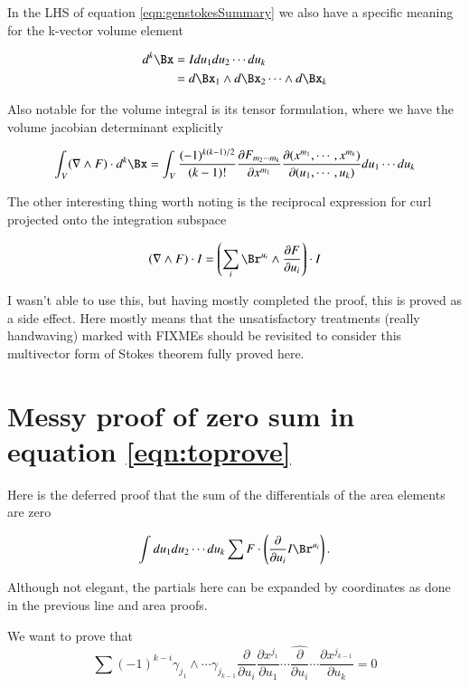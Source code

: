\documentclass{article}
\newcommand{\grad}[0]{\nabla}
\newcommand{\PD}[2]{\frac{\partial {#2}}{\partial {#1}}}
\begin{document}
In the LHS of equation \ref{eqn:genstokesSummary} we also have a specific meaning for the k-vector volume element

\begin{align}
d^{k}\Bx 
&= I du_1 du_2 \cdots du_k \\
&= d\Bx_1 \wedge d\Bx_2 \cdots \wedge d\Bx_k
\end{align}

Also notable for the volume integral is its tensor formulation, where we have the volume jacobian determinant explicitly

\begin{equation}
\int_V (\grad \wedge F) \cdot d^{k}\Bx 
= \int_V
\frac{(-1)^{k(k-1)/2}}{(k-1)!} 
\PD{x^{m_{1}}}{F_{m_2 \cdots m_{k}}}
\frac{\partial( x^{m_1}, \cdots, x^{m_k} )}{\partial( u_1, \cdots, u_k )} du_1 \cdots du_k
\end{equation}

The other interesting thing worth noting is the reciprocal expression for curl projected onto the integration subspace

\begin{equation}
(\grad \wedge F) \cdot I = \left( \sum_i \Br^{u_i} \wedge \PD{u_i}{F} \right) \cdot I 
\end{equation}

I wasn't able to use this, but having mostly completed the proof, this is proved as a side effect.  Here mostly means that the
unsatisfactory treatments (really handwaving) marked with FIXMEs should be revisited to consider this multivector form of Stokes theorem fully proved here.

\section{ Messy proof of zero sum in equation \ref{eqn:toprove} }

Here is the deferred proof that the sum of the differentials of the area elements are zero

\begin{align*}
\int du_1 du_2 \cdots du_k \sum F \cdot \left( \PD{u_i}{} I \Br^{u_i} \right).
\end{align*}

Although not elegant, the partials here can be expanded by coordinates as done in the previous line and area proofs.

We want to prove that 
\begin{equation}
\sum (-1)^{k-i} \gamma_{j_1} \wedge \cdots \gamma_{j_{k-1}} \PD{u_i}{}
\PD{u_1}{x^{j_1}} \cdots \widehat{\PD{u_i}{}} \cdots \PD{u_k}{x^{j_{k-1}}}
= 0
\end{equation}
\end{document}
